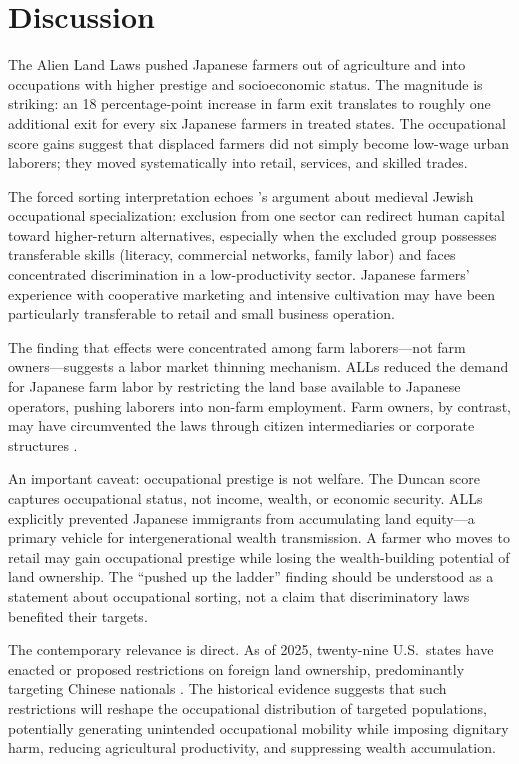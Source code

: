 \documentclass[12pt]{article}
\begin{document}
\section{Discussion}

The Alien Land Laws pushed Japanese farmers out of agriculture and into occupations with higher prestige and socioeconomic status. The magnitude is striking: an 18 percentage-point increase in farm exit translates to roughly one additional exit for every six Japanese farmers in treated states. The occupational score gains suggest that displaced farmers did not simply become low-wage urban laborers; they moved systematically into retail, services, and skilled trades.

The forced sorting interpretation echoes \citet{botticini2012chosen}'s argument about medieval Jewish occupational specialization: exclusion from one sector can redirect human capital toward higher-return alternatives, especially when the excluded group possesses transferable skills (literacy, commercial networks, family labor) and faces concentrated discrimination in a low-productivity sector. Japanese farmers' experience with cooperative marketing and intensive cultivation may have been particularly transferable to retail and small business operation.

The finding that effects were concentrated among farm laborers---not farm owners---suggests a labor market thinning mechanism. ALLs reduced the demand for Japanese farm labor by restricting the land base available to Japanese operators, pushing laborers into non-farm employment. Farm owners, by contrast, may have circumvented the laws through citizen intermediaries or corporate structures \citep{chuman1976bamboo}.

An important caveat: occupational prestige is not welfare. The Duncan score captures occupational status, not income, wealth, or economic security. ALLs explicitly prevented Japanese immigrants from accumulating land equity---a primary vehicle for intergenerational wealth transmission. A farmer who moves to retail may gain occupational prestige while losing the wealth-building potential of land ownership. The ``pushed up the ladder'' finding should be understood as a statement about occupational sorting, not a claim that discriminatory laws benefited their targets.

The contemporary relevance is direct. As of 2025, twenty-nine U.S.\ states have enacted or proposed restrictions on foreign land ownership, predominantly targeting Chinese nationals \citep{chen2024alien}. The historical evidence suggests that such restrictions will reshape the occupational distribution of targeted populations, potentially generating unintended occupational mobility while imposing dignitary harm, reducing agricultural productivity, and suppressing wealth accumulation.
\end{document}
